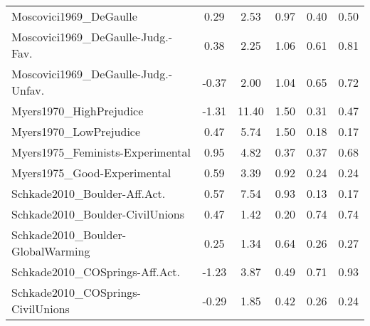 \begin{longtable}{lccccc}
Moscovici1969\_DeGaulle & 0.29 & 2.53 & 0.97 & 0.40 & 0.50\\
Moscovici1969\_DeGaulle-Judg.-Fav. & 0.38 & 2.25 & 1.06 & 0.61 & 0.81\\
\addlinespace
Moscovici1969\_DeGaulle-Judg.-Unfav. & -0.37 & 2.00 & 1.04 & 0.65 & 0.72\\
Myers1970\_HighPrejudice & -1.31 & 11.40 & 1.50 & 0.31 & 0.47\\
Myers1970\_LowPrejudice & 0.47 & 5.74 & 1.50 & 0.18 & 0.17\\
Myers1975\_Feminists-Experimental & 0.95 & 4.82 & 0.37 & 0.37 & 0.68\\
Myers1975\_Good-Experimental & 0.59 & 3.39 & 0.92 & 0.24 & 0.24\\
\addlinespace
Schkade2010\_Boulder-Aff.Act. & 0.57 & 7.54 & 0.93 & 0.13 & 0.17\\
Schkade2010\_Boulder-CivilUnions & 0.47 & 1.42 & 0.20 & 0.74 & 0.74\\
Schkade2010\_Boulder-GlobalWarming & 0.25 & 1.34 & 0.64 & 0.26 & 0.27\\
Schkade2010\_COSprings-Aff.Act. & -1.23 & 3.87 & 0.49 & 0.71 & 0.93\\
Schkade2010\_COSprings-CivilUnions & -0.29 & 1.85 & 0.42 & 0.26 & 0.24\\*
\end{longtable}

